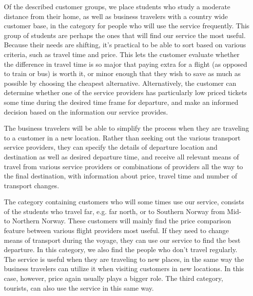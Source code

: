 Of the described customer groups, we place students who study a moderate distance from their home, as well as business travelers with a country wide customer base, in the category for people who will use the service frequently. This group of students are perhaps the ones that will find our service the most useful. Because their needs are shifting, it's practical to be able to sort based on various criteria, such as travel time and price. This lets the customer evaluate whether the difference in travel time is so major that paying extra for a flight (as opposed to train or bus) is worth it, or minor enough that they wish to save as much as possible by choosing the cheapest alternative. Alternatively, the customer can determine whether one of the service providers has particularly low priced tickets some time during the desired time frame for departure, and make an informed decision based on the information our service provides.

The business travelers will be able to simplify the process when they are traveling to a customer in a new location. Rather than seeking out the various transport service providers, they can specify the details of departure location and destination as well as desired departure time, and receive all relevant means of travel from various service providers or combinations of providers all the way to the final destination, with information about price, travel time and number of transport changes.

The category containing customers who will some times use our service, consists of the students who travel far, e.g. far north, or to Southern Norway from Mid- to Northern Norway. These customers will mainly find the price comparison feature between various flight providers most useful. If they need to change means of transport during the voyage, they can use our service to find the best departure. In this category, we also find the people who don't travel regularly. The service is useful when they are traveling to new places, in the same way the business travelers can utilize it when visiting customers in new locations. In this case, however, price again usually plays a bigger role. The third category, tourists, can also use the service in this same way.
